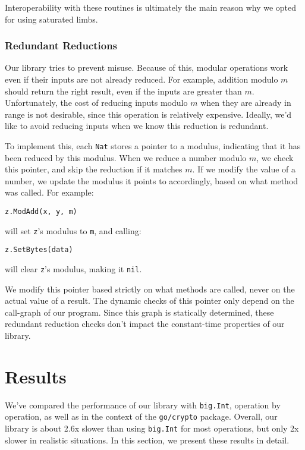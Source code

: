 \documentclass[11pt, a4paper]{article} %
\begin{document}
{Interoperability with these routines
is ultimately the main reason why we opted
for using saturated limbs.

\subsubsection{Redundant Reductions}

Our library tries to prevent misuse. Because of this,
modular operations work even if their inputs are not already
reduced. For example, addition modulo $m$ should return the
right result, even if the inputs are greater than $m$.
Unfortunately, the cost of reducing inputs modulo $m$ when
they are already in range is not desirable, since this operation
is relatively expensive. Ideally, we'd like to avoid reducing
inputs when we know this reduction
is redundant.

To implement this, each \texttt{Nat} stores a pointer to a modulus,
indicating that it has been reduced by this modulus.
When we reduce a number modulo $m$, we check this pointer,
and skip the reduction if it matches $m$. If we modify
the value of a number, we update the modulus it points to
accordingly, based on what method was called.
For example:
\begin{verbatim}
z.ModAdd(x, y, m)
\end{verbatim}
will set \texttt{z}'s modulus to \texttt{m}, and calling:
\begin{verbatim}
z.SetBytes(data)
\end{verbatim}
will clear \texttt{z}'s modulus, making it \texttt{nil}.

We modify this pointer based strictly on what methods are called,
never on the actual value of a result. The dynamic
checks of this pointer only depend on the call-graph of our program.
Since this graph is statically determined, these redundant reduction
checks don't impact the constant-time properties of our library.

\section{Results}

We've compared the performance of our library
with \texttt{big.Int}, operation by operation, as well as in the
context of the \texttt{go/crypto} package.
Overall, our library is about 2.6x slower than using
\texttt{big.Int} for most operations,
but only 2x slower in realistic situations.
In this section, we
present these results in detail.

}
\end{document}
